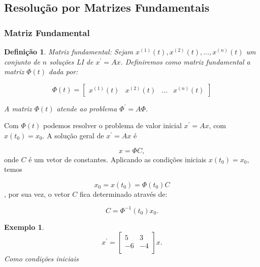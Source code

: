 \documentclass[a4paper,portuguese,9pt,final]{extarticle}
\newtheorem*{definition}{Definição}
\newtheorem{example}{Exemplo}[section]
\begin{document}
\begin{multicols*}{2}
        \subsection{Resolução por Matrizes Fundamentais}
        
            \subsubsection{Matriz Fundamental}

            \begin{definition}
                Matriz fundamental: Sejam $x^{(1)}(t),x^{(2)}(t), \ldots,
                x^{(n)}(t)$ um conjunto de $n$ soluções LI de $x^\prime = Ax$. Definiremos como matriz fundamental a matriz $\Phi (t)$ dada por:
                
                \begin{equation*}
                    \Phi (t) = \begin{bmatrix}  x^{(1)}(t) & x^{(2)}(t)& \ldots& x^{(n)}(t) \end{bmatrix}
                \end{equation*}
                
                A matriz $\Phi (t)$ atende ao problema $\Phi^\prime = A \Phi$.
                
            \end{definition}
            
            Com $\Phi (t)$ podemos resolver o problema de valor inicial $x^\prime =  Ax$, com $x(t_0)=x_0$. A solução geral de $x^\prime = Ax$ é
            
            $$x = \Phi C,$$ onde $C$ é um vetor de constantes. Aplicando as condições iniciais $x(t_0)=x_0$, temos
            
            $$x_0 = x(t_0) = \Phi (t_0)C$$, por sua vez, o vetor $C$ fica determinado através de:
            
            $$C=\Phi^{-1} (t_0)x_0.$$
            
            \begin{example}
                \begin{equation*}
                    x^\prime = \begin{bmatrix}
                                         5 & 3 \\
                                     -6 & -4\\
                                     \end{bmatrix} x. 
                \end{equation*}     
            Como condições iniciais
            

\end{example}
\end{multicols*}
\end{document}
